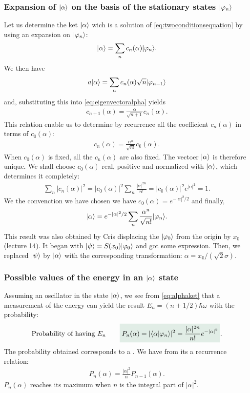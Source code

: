 \subsubsection{Expansion of $|\alpha\rangle$ on the basis of the stationary states $|\varphi_n\rangle$}
Let us determine the ket $|\alpha\rangle$ wich is a solution of \eqref{eq:twoconditionsequation} by using an expansion on $|\varphi_n\rangle$:
\begin{align*}
    |\alpha\rangle=\sum_nc_n(\alpha)|\varphi_n\rangle.
\end{align*}
We then have 
\begin{align*}
    a|\alpha\rangle=\sum_nc_n(\alpha)\sqrt{n}|\varphi_{n-1}\rangle
\end{align*}
and, substituting this into \eqref{eq:eigenvectoralpha} yields 
\begin{align*}
    c_{n+1}(\alpha)=\frac{\alpha}{\sqrt{n+1}}c_n(\alpha).
\end{align*}
This relation enable us to determine by recurrence all the coefficient $c_n(\alpha)$ in terms of $c_0(\alpha)$:
\begin{align}
    c_n(\alpha)=\frac{\alpha^n}{\sqrt{n!}}c_0(\alpha).
\end{align}
When $c_0(\alpha)$ is fixed, all the $c_n(\alpha)$ are also fixed. The vectoer $|\alpha\rangle$ is therefore unique. We shall choose $c_0(\alpha)$ real, positive and 
normalized with $|\alpha\rangle$, which determines it completely:
\begin{align}
    \sum_n|c_n(\alpha)|^2=|c_0(\alpha)|^2\sum_n\frac{|\alpha|^{2n}}{n!}=|c_0(\alpha)|^2e^{|\alpha|^2}=1.
\end{align}
We the convenction we have chosen we have $c_0(\alpha)=e^{-|\alpha|^2/2}$ and finally,
\begin{align}
    |\alpha\rangle=e^{-|\alpha|^2/2}\sum_n\frac{\alpha^n}{\sqrt{n!}}|\varphi_n\rangle.
    \label{eq:alphaket}
\end{align}
This result was also obtained by Cris displacing the $|\varphi_0\rangle$ from the origin by $x_0$ (lecture 14). It began with $|\psi\rangle=S(x_0)|\varphi_0\rangle$ and got some expression.
Then, we replaced $|\psi\rangle$ by $|\alpha\rangle$ with the corresponding transformation: $\alpha=x_0/(\sqrt{2}\sigma)$.
%
\subsubsection{Possible values of the energy in an $|\alpha\rangle$ state}
Assuming an oscillator in the state $|\alpha\rangle$, we see from \eqref{eq:alphaket} that a measurement of the energy can yield the result $E_n=(n+1/2)\hbar\omega$ with the probability:
\begin{align}
    \text{Probability of having $E_n$}\qquad\highlight{P_n(\alpha)=|\braket{\alpha|\varphi_n}|^2=\frac{|\alpha|^{2n}}{n!}e^{-|\alpha|^2}}.
\end{align}
The probability obtained corresponds to a . We have from its a recurrence relation:
\begin{align*}
    P_n(\alpha)=\frac{|\alpha|^2}{n}P_{n-1}(\alpha).
\end{align*}
$P_n(\alpha)$ reaches its maximum when $n$ is the integral part of $|\alpha|^2$.
%
